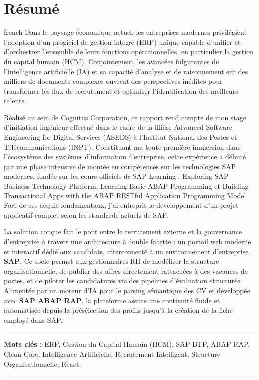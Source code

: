 \chapter*{Résumé}

\begin{otherlanguage*}{french}
\enlargethispage{\baselineskip}%
Dans le paysage économique actuel, les entreprises modernes privilégient l'adoption d'un progiciel de gestion intégré (ERP) unique capable d'unifier et d'orchestrer l'ensemble de leurs fonctions opérationnelles, en particulier la gestion du capital humain (HCM). Conjointement, les avancées fulgurantes de l'intelligence artificielle (IA) et sa capacité d'analyse et de raisonnement sur des milliers de documents complexes ouvrent des perspectives inédites pour transformer les flux de recrutement et optimiser l'identification des meilleurs talents.

Réalisé au sein de Cognitus Corporation, ce rapport rend compte de mon stage d'initiation ingénieur effectué dans le cadre de la filière Advanced Software Engineering for Digital Services (ASEDS) à l'Institut National des Postes et Télécommunications (INPT). Constituant ma toute première immersion dans l'écosystème des systèmes d'information d'entreprise, cette expérience a débuté par une phase intensive de montée en compétences sur les technologies SAP modernes, fondée sur les cours officiels de SAP Learning : Exploring SAP Business Technology Platform, Learning Basic ABAP Programming et Building Transactional Apps with the ABAP RESTful Application Programming Model. Fort de ces acquis fondamentaux, j'ai entrepris le développement d'un projet applicatif complet selon les standards actuels de SAP.

La solution conçue fait le pont entre le recrutement externe et la gouvernance d'entreprise à travers une architecture à double facette : un portail web moderne et interactif dédié aux candidats, interconnecté à un environnement d'entreprise \textbf{SAP}. Ce socle permet aux gestionnaires RH de modéliser la structure organisationnelle, de publier des offres directement rattachées à des vacances de postes, et de piloter les candidatures via des pipelines d'évaluation structurés. Alimentée par un moteur d'IA pour le parsing sémantique des CV et développée avec \textbf{SAP ABAP RAP}, la plateforme assure une continuité fluide et automatisée depuis la présélection des profils jusqu'à la création de la fiche employé dans SAP.

\noindent\rule[2pt]{\textwidth}{0.5pt}

{\textbf{Mots clés :}}
ERP, Gestion du Capital Humain (HCM), SAP BTP, ABAP RAP, Clean Core, Intelligence Artificielle, Recrutement Intelligent, Structure Organisationnelle, React.
\\
\noindent\rule[2pt]{\textwidth}{0.5pt}\par
\end{otherlanguage*}